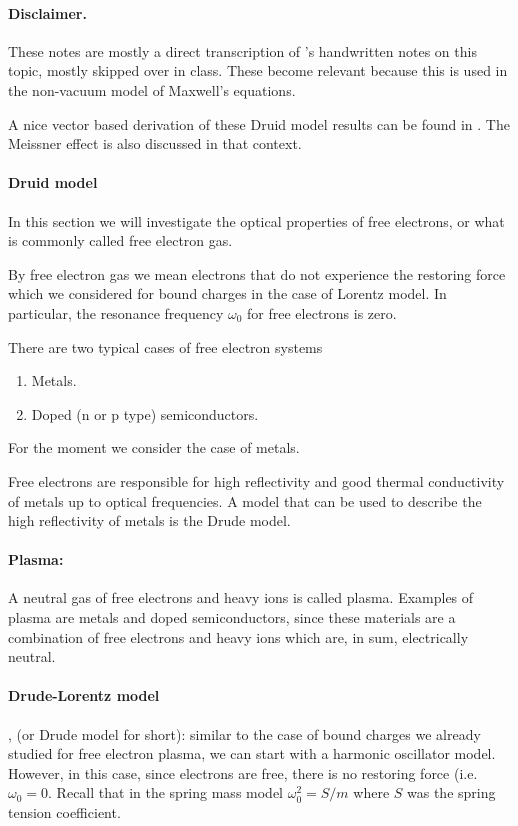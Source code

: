 \paragraph{Disclaimer.}

These notes are mostly a direct transcription of \mo's handwritten notes on this topic, mostly skipped over in class.  These become relevant because this is used in the non-vacuum model of Maxwell's equations.

A nice vector based derivation of these Druid model results can be found in \citep{ashcroft1976solid}.  The Meissner effect is also discussed in that context.

\paragraph{Druid model}

In this section we will investigate the optical properties of free electrons, or what is commonly called free electron gas.

By free electron gas we mean electrons that do not experience the restoring force which we considered for bound charges in the case of Lorentz model.  In particular, the resonance frequency \( \omega_0 \) for free electrons is zero.

There are two typical cases of free electron systems 

\begin{enumerate}[a]
\item Metals.
\item Doped (n or p type) semiconductors.
\end{enumerate}

For the moment we consider the case of metals.

Free electrons are responsible for high reflectivity and good thermal conductivity of metals up to optical frequencies.  A model that can be used to describe the high reflectivity of metals is the Drude model.

\paragraph{Plasma:} A neutral gas of free electrons and heavy ions is called plasma.  Examples of plasma are metals and doped semiconductors, since these materials are a combination of free electrons and heavy ions which are, in sum, electrically neutral.

\paragraph{Drude-Lorentz model}, (or Drude model for short): similar to the case of bound charges we already studied for free electron plasma, we can start with a harmonic oscillator model.  However, in this case, since electrons are free, there is no restoring force (i.e. \(\omega_0 = 0 \).  Recall that in the spring mass model \( \omega_0^2 = S/m \) where \( S \) was the spring tension coefficient.

